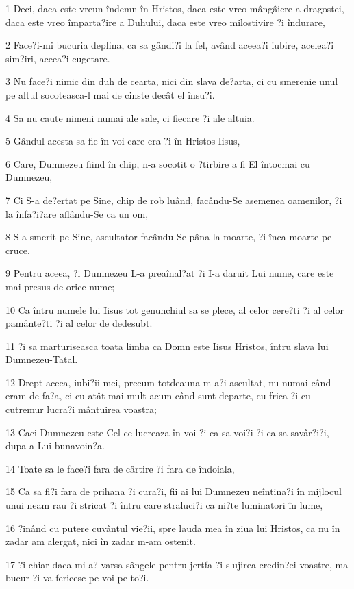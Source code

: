 \par 1 Deci, daca este vreun îndemn în Hristos, daca este vreo mângâiere a dragostei, daca este vreo împarta?ire a Duhului, daca este vreo milostivire ?i îndurare,
\par 2 Face?i-mi bucuria deplina, ca sa gândi?i la fel, având aceea?i iubire, acelea?i sim?iri, aceea?i cugetare.
\par 3 Nu face?i nimic din duh de cearta, nici din slava de?arta, ci cu smerenie unul pe altul socoteasca-l mai de cinste decât el însu?i.
\par 4 Sa nu caute nimeni numai ale sale, ci fiecare ?i ale altuia.
\par 5 Gândul acesta sa fie în voi care era ?i în Hristos Iisus,
\par 6 Care, Dumnezeu fiind în chip, n-a socotit o ?tirbire a fi El întocmai cu Dumnezeu,
\par 7 Ci S-a de?ertat pe Sine, chip de rob luând, facându-Se asemenea oamenilor, ?i la înfa?i?are aflându-Se ca un om,
\par 8 S-a smerit pe Sine, ascultator facându-Se pâna la moarte, ?i înca moarte pe cruce.
\par 9 Pentru aceea, ?i Dumnezeu L-a preaînal?at ?i I-a daruit Lui nume, care este mai presus de orice nume;
\par 10 Ca întru numele lui Iisus tot genunchiul sa se plece, al celor cere?ti ?i al celor pamânte?ti ?i al celor de dedesubt.
\par 11 ?i sa marturiseasca toata limba ca Domn este Iisus Hristos, întru slava lui Dumnezeu-Tatal.
\par 12 Drept aceea, iubi?ii mei, precum totdeauna m-a?i ascultat, nu numai când eram de fa?a, ci cu atât mai mult acum când sunt departe, cu frica ?i cu cutremur lucra?i mântuirea voastra;
\par 13 Caci Dumnezeu este Cel ce lucreaza în voi ?i ca sa voi?i ?i ca sa savâr?i?i, dupa a Lui bunavoin?a.
\par 14 Toate sa le face?i fara de cârtire ?i fara de îndoiala,
\par 15 Ca sa fi?i fara de prihana ?i cura?i, fii ai lui Dumnezeu neîntina?i în mijlocul unui neam rau ?i stricat ?i întru care straluci?i ca ni?te luminatori în lume,
\par 16 ?inând cu putere cuvântul vie?ii, spre lauda mea în ziua lui Hristos, ca nu în zadar am alergat, nici în zadar m-am ostenit.
\par 17 ?i chiar daca mi-a? varsa sângele pentru jertfa ?i slujirea credin?ei voastre, ma bucur ?i va fericesc pe voi pe to?i.
